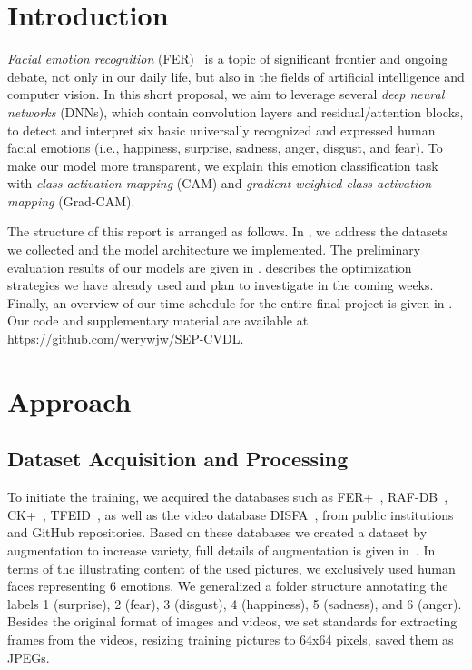 \section{Introduction}
\label{sec:intro}

\textit{Facial emotion recognition} (FER)~\cite{Ko18,JainSS19} is a topic of significant frontier and ongoing debate, 
not only in our daily life, but also in the fields of artificial intelligence and computer vision.
In this short proposal, we aim to leverage several \textit{deep neural networks} (DNNs), 
which contain convolution layers and residual/attention blocks, 
to detect and interpret six basic universally recognized and expressed human facial emotions 
(i.e., happiness, surprise, sadness, anger, disgust, and fear). 
To make our model more transparent, 
we explain this emotion classification task with \textit{class activation mapping} (CAM) and \textit{gradient-weighted class activation mapping} (Grad-CAM). 

The structure of this report is arranged as follows. 
In , 
we address the datasets we collected and the model architecture we implemented. 
The preliminary evaluation results of our models are given in . 
 describes the optimization strategies we have already used and plan to investigate in the coming weeks. 
Finally,
an overview of our time schedule for the entire final project is given in . 
Our code and supplementary material are available at \url{https://github.com/werywjw/SEP-CVDL}.


\section{Approach}
\label{sec:approach}

\subsection{Dataset Acquisition and Processing}
\label{sec:datasets}
To initiate the training, 
we acquired the databases such as FER+~\cite{BarsoumZCZ16}, RAF-DB~\cite{li_reliable_2017,li2019reliable}, CK+~\cite{LuceyCKSAM10}, 
TFEID~\cite{tfeid,LiGL22}, 
as well as the video database DISFA~\cite{MavadatiMBTC13}, 
from public institutions and GitHub repositories. %
Based on these databases we created a dataset by augmentation to increase variety, 
full details of augmentation is given in~. 
In terms of the illustrating content of the used pictures, we exclusively used human faces representing 6 emotions. 
We generalized a folder structure annotating the labels 1 (surprise), 2 (fear), 3 (disgust), 4 (happiness), 5 (sadness), and 6 (anger). 
Besides the original format of images and videos, we set standards for extracting frames from the videos, resizing training pictures to 64x64 pixels, saved them as JPEGs.

